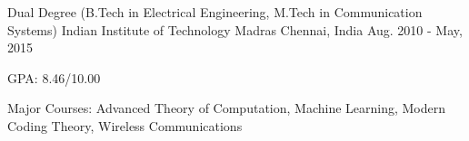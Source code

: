 \begin{cventries}
	\cventry
	{Dual Degree (B.Tech in Electrical Engineering, M.Tech in Communication Systems)}
	{Indian Institute of Technology Madras}
	{Chennai, India}
	{Aug. 2010 - May, 2015}
	{
		\begin{cvitems}
		\item{GPA: 8.46/10.00}
		\item{Major Courses: Advanced Theory of Computation, Machine Learning, Modern Coding Theory, Wireless Communications}
		\end{cvitems}
	}
\end{cventries}

